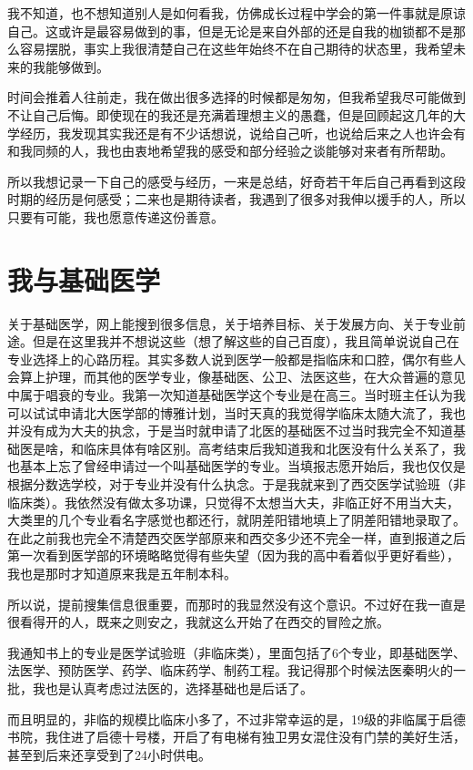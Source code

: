\documentclass[zihao=-4,fontset=none]{Beautybook-CN}
\begin{document}
我不知道，也不想知道别人是如何看我，仿佛成长过程中学会的第一件事就是原谅自己。这或许是最容易做到的事，但是无论是来自外部的还是自我的枷锁都不是那么容易摆脱，事实上我很清楚自己在这些年始终不在自己期待的状态里，我希望未来的我能够做到。

时间会推着人往前走，我在做出很多选择的时候都是匆匆，但我希望我尽可能做到不让自己后悔。即使现在的我还是充满着理想主义的愚蠢，但是回顾起这几年的大学经历，我发现其实我还是有不少话想说，说给自己听，也说给后来之人\textemdash{}\textemdash{}也许会有和我同频的人，我也由衷地希望我的感受和部分经验之谈能够对来者有所帮助。

所以我想记录一下自己的感受与经历，一来是总结，好奇若干年后自己再看到这段时期的经历是何感受；二来也是期待读者，我遇到了很多对我伸以援手的人，所以只要有可能，我也愿意传递这份善意。

\section{我与基础医学}

关于基础医学，网上能搜到很多信息，关于培养目标、关于发展方向、关于专业前途。但是在这里我并不想说这些（想了解这些的自己百度），我且简单说说自己在专业选择上的心路历程。其实多数人说到医学一般都是指临床和口腔，偶尔有些人会算上护理，而其他的医学专业，像基础医、公卫、法医这些，在大众普遍的意见中属于唱衰的专业。我第一次知道基础医学这个专业是在高三。当时班主任认为我可以试试申请北大医学部的博雅计划，当时天真的我觉得学临床太随大流了，我也并没有成为大夫的执念，于是当时就申请了北医的基础医\textemdash{}\textemdash{}不过当时我完全不知道基础医是啥，和临床具体有啥区别。高考结束后我知道我和北医没有什么关系了，我也基本上忘了曾经申请过一个叫基础医学的专业。当填报志愿开始后，我也仅仅是根据分数选学校，对于专业并没有什么执念。于是我就来到了西交医学试验班（非临床类）。我依然没有做太多功课，只觉得不太想当大夫，非临正好不用当大夫，大类里的几个专业看名字感觉也都还行，就阴差阳错地填上了阴差阳错地录取了。在此之前我也完全不清楚西交医学部原来和西交多少还不完全一样，直到报道之后第一次看到医学部的环境略略觉得有些失望（因为我的高中看着似乎更好看些），我也是那时才知道原来我是五年制本科。

所以说，提前搜集信息很重要，而那时的我显然没有这个意识。不过好在我一直是很看得开的人，既来之则安之，我就这么开始了在西交的冒险之旅。

我通知书上的专业是医学试验班（非临床类），里面包括了6个专业，即基础医学、法医学、预防医学、药学、临床药学、制药工程。我记得那个时候法医秦明火的一批，我也是认真考虑过法医的，选择基础也是后话了。

而且明显的，非临的规模比临床小多了，不过非常幸运的是，19级的非临属于启德书院，我住进了启德十号楼，开启了有电梯有独卫男女混住没有门禁的美好生活，甚至到后来还享受到了24小时供电。
\end{document}
